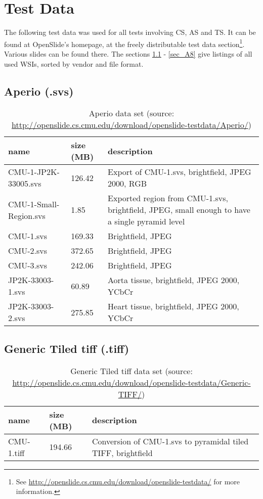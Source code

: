 \chapter{Test Data}
\label{secA}
The following test data was used for all tests involving CS, AS and TS. It can be found at OpenSlide's homepage, at the freely distributable test data section\footnote{
	See \url{http://openslide.cs.cmu.edu/download/openslide-testdata/} for more information.
}. Various slides can be found there. The sections \ref{sec_A1} - \ref{sec_A8} give listings of all used WSIs, sorted by vendor and file format.

\section{Aperio (.svs)}
\label{sec_A1}

\begin{table}[H]
	\begin{center}
		\begin{tabular}{| p{4cm} | p{2cm} | p{5cm} |}
			\hline
			\textbf{name} & \textbf{size (MB)} & \textbf{description} \\ \hline
			CMU-1-JP2K-33005.svs & 126.42 & Export of CMU-1.svs, brightfield, JPEG 2000, RGB\\ \hline
			CMU-1-Small-Region.svs & 1.85 & Exported region from CMU-1.svs, brightfield, JPEG, small enough to have a single pyramid level \\ \hline
			CMU-1.svs & 169.33 & Brightfield, JPEG \\ \hline
			CMU-2.svs & 372.65 & Brightfield, JPEG \\ \hline	
			CMU-3.svs & 242.06 & Brightfield, JPEG \\ \hline	
			JP2K-33003-1.svs & 60.89 & Aorta tissue, brightfield, JPEG 2000, YCbCr \\ \hline
			JP2K-33003-2.svs & 275.85 & Heart tissue, brightfield, JPEG 2000, YCbCr  \\ \hline
		\end{tabular}
		\caption{Aperio data set (source: \url{http://openslide.cs.cmu.edu/download/openslide-testdata/Aperio/})}
	\end{center}
\end{table}


\section{Generic Tiled tiff (.tiff)}

\begin{table}[H]
	\begin{center}
		\begin{tabular}{| p{4cm} | p{2cm} | p{5cm} |}
			\hline
			\textbf{name} & \textbf{size (MB)} & \textbf{description} \\ \hline
			CMU-1.tiff & 194.66 & Conversion of CMU-1.svs to pyramidal tiled TIFF, brightfield \\ \hline
		\end{tabular}
		\caption{Generic Tiled tiff data set (source: \url{http://openslide.cs.cmu.edu/download/openslide-testdata/Generic-TIFF/})}
	\end{center}
\end{table}


